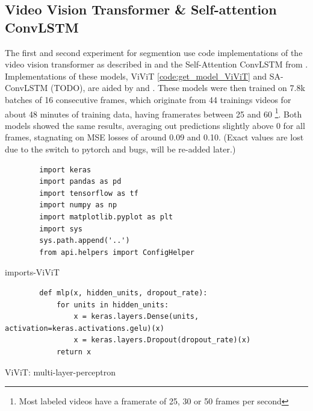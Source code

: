 \subsection{Video Vision Transformer \& Self-attention ConvLSTM}
\label{subsec:video-models-from-scratch}

The first and second experiment for segmention use code implementations of the video vision transformer as described in \textcite{Arnab2021} and the Self-Attention ConvLSTM from \textcite{Lin_2020}.
Implementations of these models, ViViT \ref{code:get_model_ViViT} and SA-ConvLSTM (TODO), are aided by \textcite{OpenAI_ChatGPT_2025} and \textcite{Deepseek_2025}.
These models were then trained on 7.8k batches of 16 consecutive frames, which originate from 44 trainings videos for about 48 minutes of training data, having framerates between 25 and 60 \footnote{Most labeled videos have a framerate of 25, 30 or 50 frames per second}.
Both models showed the same results, averaging out predictions slightly above 0 for all frames, stagnating on MSE losses of around 0.09 and 0.10. (Exact values are lost due to the switch to pytorch and bugs, will be re-added later.)

\begin{listing}
    \begin{verbatim}
        import keras
        import pandas as pd
        import tensorflow as tf
        import numpy as np
        import matplotlib.pyplot as plt
        import sys
        sys.path.append('..')
        from api.helpers import ConfigHelper
    \end{verbatim}
    \caption[imports-ViViT]{imports-ViViT}
    \label{code:imports-ViViT}
\end{listing}


\begin{listing}
    \begin{verbatim}
        def mlp(x, hidden_units, dropout_rate):
            for units in hidden_units:
                x = keras.layers.Dense(units, activation=keras.activations.gelu)(x)
                x = keras.layers.Dropout(dropout_rate)(x)
            return x
    \end{verbatim}
    \caption[mlp layer]{ViViT: multi-layer-perceptron}
    \label{code:mlp-layer}
\end{listing}


